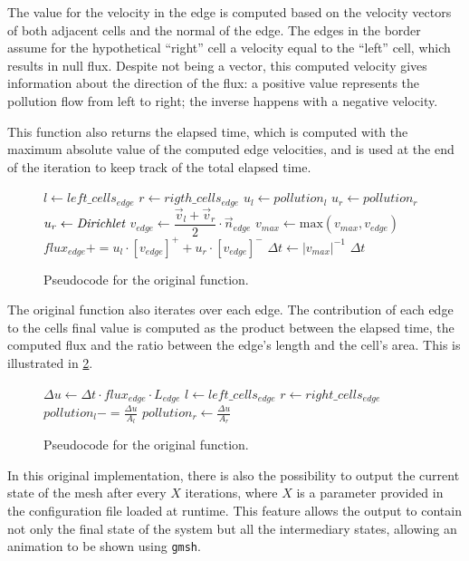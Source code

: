 The value for the velocity in the edge is computed based on the velocity vectors of both adjacent cells and the normal of the edge.
The edges in the border assume for the hypothetical ``right'' cell a velocity equal to the ``left'' cell, which results in null flux.
Despite not being a vector, this computed velocity gives information about the direction of the flux:
a positive value represents the pollution flow from left to right; the inverse happens with a negative velocity.

This function also returns the elapsed time, which is computed with the maximum absolute value of the computed edge velocities, and is used at the end of the iteration to keep track of the total elapsed time.

\begin{figure}[!htp]
	\begin{alg}
			\State $l     \gets left\_cells_{edge}$
			\State $r     \gets rigth\_cells_{edge}$
			\State $u_{l} \gets pollution_{l}$
				\State $u_{r} \gets pollution_{r}$
			\Else
				\State $u_{r} \gets \textit{Dirichlet}$ 
			\EndIf
			\State $v_{edge} \gets \dfrac{\vec{v}_{l} + \vec{v}_{r}}{2} \cdot \vec{n}_{edge}$
			\State $v_{max} \gets \mathrm{max}(v_{max}, v_{edge})$
			\State $flux_{edge} += u_{l} \cdot [v_{edge}]^{+} + u_{r} \cdot [v_{edge}]^{-}$
		\EndFor
		\State $\Delta t \gets |v_{max}|^{-1}$
		\State \Return $\Delta t$
	\end{alg}

	\caption{Pseudocode for the original \computeflux function.}
	\label{alg:flux}
\end{figure}

The original \update function also iterates over each edge.
The contribution of each edge to the cells final value is computed as the product between the elapsed time, the computed flux and the ratio between the edge's length and the cell's area.
This is illustrated in \cref{alg:update}.

\begin{figure}[!htp]
	\begin{alg}
		\ForAll {$edge \in Edges$}
			\State $\Delta{u} \gets \Delta{t} \cdot flux_{edge} \cdot L_{edge}$
			\State $l \gets left\_cells_{edge}$
			\State $r \gets right\_cells_{edge}$
			\State $pollution_{l} -= \frac{\Delta{u}}{A_{l}}$
			\If {$\exists Cells_{r}$}
				\State $pollution_{r} \gets \frac{\Delta{u}}{A_{r}}$
			\EndIf
		\EndFor
	\end{alg}

	\caption{Pseudocode for the original \update function.}
	\label{alg:update}
\end{figure}

In this original implementation, there is also the possibility to output the current state of the mesh after every $X$ iterations, where $X$ is a parameter provided in the configuration file loaded at runtime.
This feature allows the output to contain not only the final state of the system but all the intermediary states, allowing  an animation to be shown using \texttt{gmsh}.


